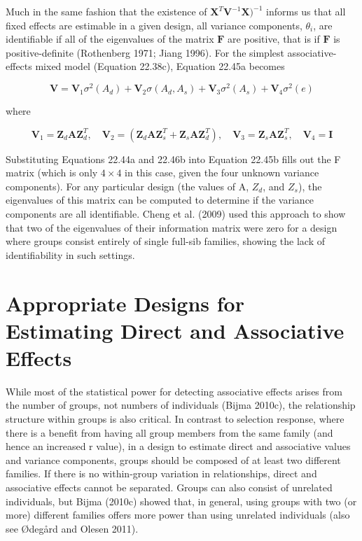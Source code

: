 \documentclass{article}
\begin{document}
Much in the same fashion that the existence of  $ \mathbf{X}^T\mathbf{V}^{-1}\mathbf{X})^{-1} $ informs us that all fixed effects are estimable in a given design, all variance components,  $ \theta_i $, are identifiable if all of the eigenvalues of the matrix  $ \mathbf{F} $ are positive, that is if  $ \mathbf{F} $ is positive-definite (Rothenberg 1971; Jiang 1996). For the simplest associative-effects mixed model (Equation 22.38c), Equation 22.45a becomes

\begin{equation}
\mathbf{V}=\mathbf{V}_{1}\sigma^{2}(A_{d})+\mathbf{V}_{2}\sigma(A_{d},A_{s})+\mathbf{V}_{3}\sigma^{2}(A_{s})+\mathbf{V}_{4}\sigma^{2}(e)
\tag{22.46a}
\label{eq:22_46a}
\end{equation}

where

\begin{equation}
\mathbf{V}_{1}=\mathbf{Z}_{d}\mathbf{A}\mathbf{Z}_{d}^{T},\quad\mathbf{V}_{2}=\left(\mathbf{Z}_{d}\mathbf{A}\mathbf{Z}_{s}^{T}+\mathbf{Z}_{s}\mathbf{A}\mathbf{Z}_{d}^{T}\right),\quad\mathbf{V}_{3}=\mathbf{Z}_{s}\mathbf{A}\mathbf{Z}_{s}^{T},\quad\mathbf{V}_{4}=\mathbf{I}
\tag{22.46b}
\label{eq:22_46b}
\end{equation}

Substituting Equations 22.44a and 22.46b into Equation 22.45b fills out the F matrix (which is only  $ 4 \times 4 $ in this case, given the four unknown variance components). For any particular design (the values of A,  $ Z_{d} $, and  $ Z_{s} $), the eigenvalues of this matrix can be computed to determine if the variance components are all identifiable. Cheng et al. (2009) used this approach to show that two of the eigenvalues of their information matrix were zero for a design where groups consist entirely of single full-sib families, showing the lack of identifiability in such settings.

\section{Appropriate Designs for Estimating Direct and Associative Effects}
While most of the statistical power for detecting associative effects arises from the number of groups, not numbers of individuals (Bijma 2010c), the relationship structure within groups is also critical. In contrast to selection response, where there is a benefit from having all group members from the same family (and hence an increased r value), in a design to estimate direct and associative values and variance components, groups should be composed of at least two different families. If there is no within-group variation in relationships, direct and associative effects cannot be separated. Groups can also consist of unrelated individuals, but Bijma (2010c) showed that, in general, using groups with two (or more) different families offers more power than using unrelated individuals (also see Ødegård and Olesen 2011).
\end{document}
